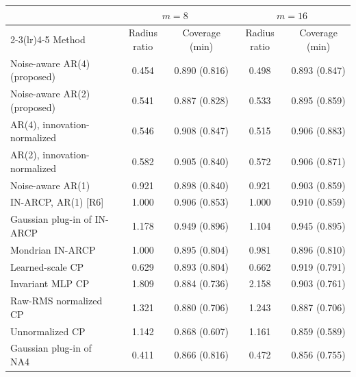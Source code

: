 \begin{tabular}{lcccc}
\toprule
 & \multicolumn{2}{c}{$m=8$} & \multicolumn{2}{c}{$m=16$}\\
\cmidrule(lr){2-3}\cmidrule(lr){4-5}
Method & Radius ratio & Coverage (min) & Radius ratio & Coverage (min)\\
\midrule
Noise-aware AR(4) (proposed) & 0.454 & 0.890 (0.816) & 0.498 & 0.893 (0.847)\\
Noise-aware AR(2) (proposed) & 0.541 & 0.887 (0.828) & 0.533 & 0.895 (0.859)\\
AR(4), innovation-normalized & 0.546 & 0.908 (0.847) & 0.515 & 0.906 (0.883)\\
AR(2), innovation-normalized & 0.582 & 0.905 (0.840) & 0.572 & 0.906 (0.871)\\
Noise-aware AR(1) & 0.921 & 0.898 (0.840) & 0.921 & 0.903 (0.859)\\
IN-ARCP, AR(1) [R6] & 1.000 & 0.906 (0.853) & 1.000 & 0.910 (0.859)\\
Gaussian plug-in of IN-ARCP & 1.178 & 0.949 (0.896) & 1.104 & 0.945 (0.895)\\
Mondrian IN-ARCP & 1.000 & 0.895 (0.804) & 0.981 & 0.896 (0.810)\\
Learned-scale CP & 0.629 & 0.893 (0.804) & 0.662 & 0.919 (0.791)\\
Invariant MLP CP & 1.809 & 0.884 (0.736) & 2.158 & 0.903 (0.761)\\
Raw-RMS normalized CP & 1.321 & 0.880 (0.706) & 1.243 & 0.887 (0.706)\\
Unnormalized CP & 1.142 & 0.868 (0.607) & 1.161 & 0.859 (0.589)\\
Gaussian plug-in of NA4 & 0.411 & 0.866 (0.816) & 0.472 & 0.856 (0.755)\\
\bottomrule
\end{tabular}
